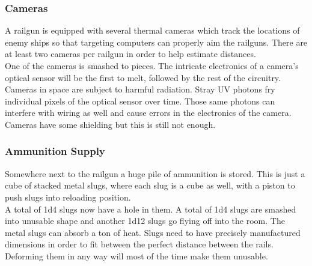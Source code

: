 \documentclass[a4paper]{article}
\begin{document}
\vspace{-0.5cm} \hspace{-18pt} \subsubsection{Cameras} \label{railgun_cameras} \vspace{-0.2cm}
A railgun is equipped with several thermal cameras which track the locations of enemy ships so that targeting computers can properly aim the railguns. There are at least two cameras per railgun in order to help estimate distances.
\\ \pbhw
{}
{One of the cameras is smashed to pieces.}
{The intricate electronics of a camera's optical sensor will be the first to melt, followed by the rest of the circuitry.}
{Cameras in space are subject to harmful radiation. Stray UV photons fry individual pixels of the optical sensor over time. Those same photons can interfere with wiring as well and cause errors in the electronics of the camera. Cameras have some shielding but this is still not enough.}


\vspace{-0.5cm} \hspace{-18pt} \subsubsection{Ammunition Supply} \label{railgun_ammunition} \vspace{-0.2cm}
Somewhere next to the railgun a huge pile of ammunition is stored. This is just a cube of stacked metal slugs, where each slug is a cube as well, with a piston to push slugs into reloading position.
\\ \pbhw
{A total of 1d4 slugs now have a hole in them.}
{A total of 1d4 slugs are smashed into unusable shape and another 1d12 slugs go flying off into the room.}
{The metal slugs can absorb a ton of heat.}
{Slugs need to have precisely manufactured dimensions in order to fit between the perfect distance between the rails. Deforming them in any way will most of the time make them unusable.}
\end{document}
